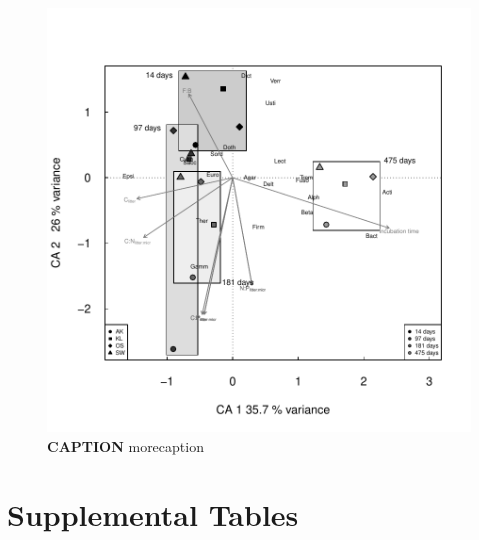\documentclass[10pt]{article}
\begin{document}
\begin{flushleft}
\newpage
\begin{figure}[h!]
\vspace*{2mm}
\begin{center}
\includegraphics{ligpaper-metaprot_pca}
\end{center}
\caption{
{\bf CAPTION} morecaption}
\label{fig:metaprotpca}
\end{figure}

\section*{Supplemental Tables}


\newpage




\begin{landscape}


\end{landscape}
\end{flushleft}
\end{document}
